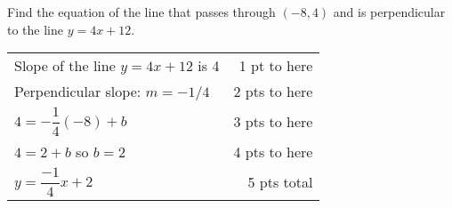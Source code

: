 
{
	Find the equation of the line that passes through $(-8,4)$ and is perpendicular to the line $y=4x+12$.
}
{
	\begin{tabular}{l r}
	Slope of the line $y=4x+12$ is 4 & 1 pt to here \\
	Perpendicular slope: $m= -1/4$ & 2 pts to here\\
	$4 = -\dfrac{1}{4}(-8) + b$ &  3 pts to here\\
	$4 =  2 + b$ so $b = 2$ & 4 pts to here\\
	$y=\dfrac{-1}{4} x+2$     & 5 pts total\\
	\end{tabular}
}
